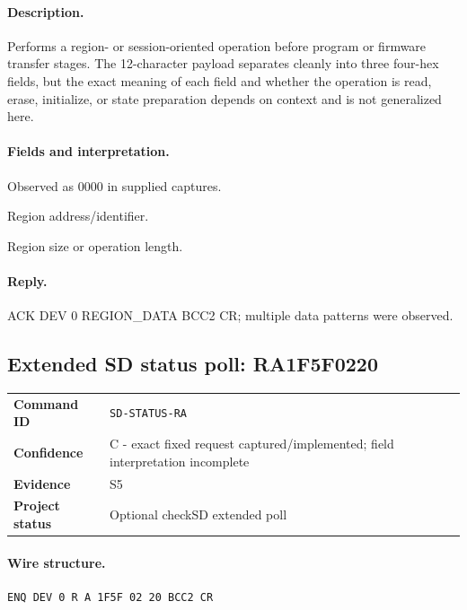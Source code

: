 \documentclass[10pt,letterpaper]{article}
\begin{document}
\paragraph{Description.} Performs a region- or session-oriented operation before program or firmware transfer stages. The 12-character payload separates cleanly into three four-hex fields, but the exact meaning of each field and whether the operation is read, erase, initialize, or state preparation depends on context and is not generalized here.
\paragraph{Fields and interpretation.}
\begin{description}[style=nextline,leftmargin=3.2cm,labelwidth=3.0cm,font=\normalfont\bfseries]
\item[SELECTOR4] Observed as 0000 in supplied captures.
\item[ADDRESS4] Region address/identifier.
\item[LENGTH4] Region size or operation length.
\end{description}
\paragraph{Reply.} ACK DEV 0 REGION\_DATA BCC2 CR; multiple data patterns were observed.

\subsection{Extended SD status poll: RA1F5F0220}
\begin{tabularx}{\textwidth}{@{}>{\bfseries}p{2.8cm}X@{}}
Command ID & \texttt{SD-STATUS-RA} \\
Confidence & C - exact fixed request captured/implemented; field interpretation incomplete \\
Evidence & S5 \\
Project status & Optional checkSD extended poll \\
\end{tabularx}
\vspace{0.35em}
\paragraph{Wire structure.}
\begin{Verbatim}[breaklines=true,breakanywhere=true,fontsize=\small]
ENQ DEV 0 R A 1F5F 02 20 BCC2 CR
\end{Verbatim}
\end{document}

